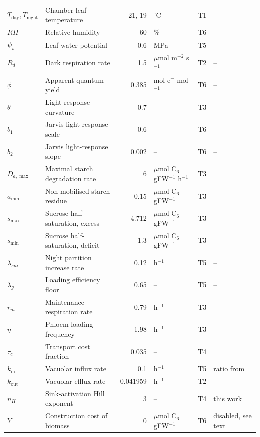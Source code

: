 \begin{table}[!htbp]
\begin{tabular}{@{}llrlll@{}}
$T_{\mathrm{day}},T_{\mathrm{night}}$ & Chamber leaf temperature & 21, 19 & $^\circ$C & T1 & \citet{Sulpice2014} \\
$\mathit{RH}$ & Relative humidity & 60 & \% & T6 & -- \\
$\psi_w$ & Leaf water potential & -0.6 & MPa & T5 & -- \\
$R_d$ & Dark respiration rate & 1.5 & $\mu$mol m$^{-2}$ s$^{-1}$ & T2 & -- \\
$\phi$ & Apparent quantum yield & 0.385 & mol e$^-$ mol$^{-1}$ & T6 & -- \\
$\theta$ & Light-response curvature & 0.7 & -- & T3 & \citet{Farquhar1984} \\
$b_1$ & Jarvis light-response scale & 0.6 & -- & T6 & -- \\
$b_2$ & Jarvis light-response slope & 0.002 & -- & T6 & -- \\
$D_{a,\max}$ & Maximal starch degradation rate & 6 & $\mu$mol C$_6$ gFW$^{-1}$ h$^{-1}$ & T3 & \citet{Tedone2020} \\
$a_{\min}$ & Non-mobilised starch residue & 0.15 & $\mu$mol C$_6$ gFW$^{-1}$ & T3 & \citet{Tedone2020} \\
$s_{\max}$ & Sucrose half-saturation, excess & 4.712 & $\mu$mol C$_6$ gFW$^{-1}$ & T3 & \citet{Tedone2020} \\
$s_{\min}$ & Sucrose half-saturation, deficit & 1.3 & $\mu$mol C$_6$ gFW$^{-1}$ & T3 & \citet{Tedone2020} \\
$\lambda_{sni}$ & Night partition increase rate & 0.12 & h$^{-1}$ & T5 & -- \\
$\lambda_g$ & Loading efficiency floor & 0.65 & -- & T5 & -- \\
$r_m$ & Maintenance respiration rate & 0.79 & h$^{-1}$ & T3 & \citet{Tedone2020} \\
$\eta$ & Phloem loading frequency & 1.98 & h$^{-1}$ & T3 & \citet{Tedone2020} \\
$\tau_c$ & Transport cost fraction & 0.035 & -- & T4 & \citet{Tedone2020} \\
$k_{\mathrm{in}}$ & Vacuolar influx rate & 0.1 & h$^{-1}$ & T5 & ratio from \citet{Seydel2025} \\
$k_{\mathrm{out}}$ & Vacuolar efflux rate & 0.041959 & h$^{-1}$ & T2 & \citet{Seydel2025} \\
$n_H$ & Sink-activation Hill exponent & 3 & -- & T4 & this work \\
$Y$ & Construction cost of biomass & 0 & $\mu$mol C$_6$ gFW$^{-1}$ & T6 & disabled, see text \\

\end{tabular}
\end{table}
